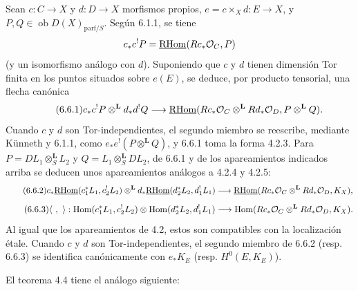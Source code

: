 Sean $c:C\to X$ y $d:D\to X$ morfismos propios, $e=c\times_Xd:E\to X$, y $P,Q\in\operatorname{ob}D(X)_{\mathrm{parf}/S}$. Según 6.1.1, se tiene
\[
c_*c^!P=\underline{\mathrm{RHom}}(Rc_*\mathcal{O}_C,P)
\]
(y un isomorfismo análogo con $d$). Suponiendo que $c$ y $d$ tienen dimensión Tor finita en los puntos situados sobre $e(E)$, se deduce, por producto tensorial, una flecha canónica
\begin{equation}
\tag{6.6.1}
c_*c^!P\otimes^{\mathbf L}d_*d^!Q\longrightarrow
\underline{\mathrm{RHom}}(Rc_*\mathcal{O}_C\otimes^{\mathbf L}Rd_*\mathcal{O}_D,P\otimes^{\mathbf L}Q).
\end{equation}
Cuando $c$ y $d$ son Tor-independientes, el segundo miembro se reescribe, mediante Künneth y 6.1.1, como $e_*e^!(P\otimes^{\mathbf L}Q)$, y 6.6.1 toma la forma 4.2.3. Para $P=DL_1\otimes_S^{\mathbf L}L_2$ y $Q=L_1\otimes_S^{\mathbf L}DL_2$, de 6.6.1 y de los apareamientos indicados arriba se deducen unos apareamientos análogos a 4.2.4 y 4.2.5:
\begin{equation}
\tag{6.6.2}
c_*\underline{\mathrm{RHom}}(c_1^*L_1,c_2^!L_2)\otimes^{\mathbf L}d_*\underline{\mathrm{RHom}}(d_2^*L_2,d_1^!L_1)
\longrightarrow\underline{\mathrm{RHom}}(Rc_*\mathcal{O}_C\otimes^{\mathbf L}Rd_*\mathcal{O}_D,K_X),
\end{equation}
\begin{equation}
\tag{6.6.3}
\langle\ ,\ \rangle:\Hom(c_1^*L_1,c_2^!L_2)\otimes\Hom(d_2^*L_2,d_1^!L_1)
\longrightarrow\Hom(Rc_*\cO_C\otimes^{\mathbf L}Rd_*\cO_D,K_X).
\end{equation}
Al igual que los apareamientos de 4.2, estos son compatibles con la localización étale. Cuando $c$ y $d$ son Tor-independientes, el segundo miembro de 6.6.2 (resp. 6.6.3) se identifica canónicamente con $e_*K_E$ (resp. $H^0(E,K_E)$).

El teorema 4.4 tiene el análogo siguiente:

